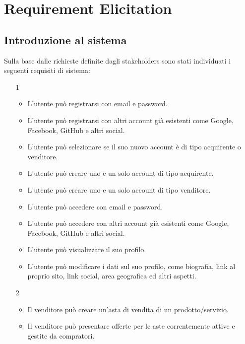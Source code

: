 
\chapter{Requirement Elicitation}
     \section{Introduzione al sistema} %
        Sulla base dalle richieste definite dagli stakeholders sono stati individuati i seguenti requisiti di sistema:
        
        \begin{itemize}
            \item[1]
            \begin{itemize} %
                \item L'utente può registrarsi con email e password.
                \item L'utente può registrarsi con altri account già esistenti come Google, Facebook, GitHub e altri social.
                \item L'utente può selezionare se il suo nuovo account è di tipo acquirente o venditore.
                \item L'utente può creare uno e un solo account di tipo acquirente.
                \item L'utente può creare uno e un solo account di tipo venditore.
                \item L'utente può accedere con email e password.
                \item L'utente può accedere con altri account già esistenti come Google, Facebook, GitHub e altri social.
                \item L'utente può visualizzare il suo profilo.
                \item L'utente può modificare i dati sul suo profilo, come biografia, link al proprio sito, link social, area geografica ed altri aspetti.
            \end{itemize} %
            \item[2] 
            \begin{itemize} %
                \item Il venditore può creare un'asta di vendita di un prodotto/servizio.
                \item Il venditore può presentare offerte per le aste correntemente attive e gestite da compratori.

\end{itemize}
\end{itemize}
